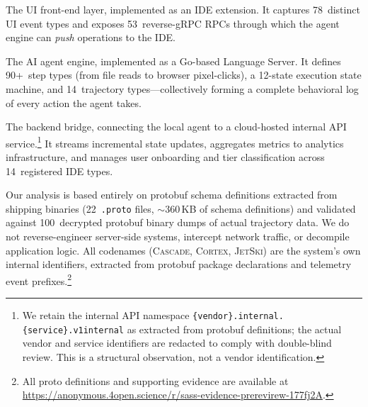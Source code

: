 \documentclass[sigconf,anonymous]{acmart}
\newcommand{\cascade}{\textsc{Cascade}\xspace}
\newcommand{\cortex}{\textsc{Cortex}\xspace}
\newcommand{\jetski}{\textsc{JetSki}\xspace}
\begin{document}
\begin{description}[style=unboxed,leftmargin=0pt,nosep]
  \item[\cascade] The UI front-end layer, implemented as an IDE
    extension.  It captures 78~distinct UI event types and exposes
    53~reverse-gRPC RPCs through which the agent engine can
    \emph{push} operations to the IDE.
  \item[\cortex] The AI agent engine, implemented as a Go-based
    Language Server.  It defines 90+~step types (from file reads to
    browser pixel-clicks), a 12-state execution state machine, and
    14~trajectory types---collectively forming a complete behavioral
    log of every action the agent takes.
  \item[\jetski] The backend bridge, connecting the local agent to
    a cloud-hosted internal API service.\footnote{We retain the internal
    API namespace \texttt{\{vendor\}.internal.\{service\}.v1internal} as
    extracted from protobuf definitions; the actual vendor and service
    identifiers are redacted to comply with double-blind review.  This
    is a structural observation, not a vendor identification.}  It streams incremental
    state updates, aggregates metrics to analytics infrastructure, and
    manages user onboarding and tier classification across 14~registered
    IDE types.
\end{description}

\noindent Our analysis is based entirely on protobuf schema definitions
extracted from shipping binaries (22~\texttt{.proto} files,
$\sim$360\,KB of schema definitions) and validated against
100~decrypted protobuf binary dumps of actual trajectory data.  We do
not reverse-engineer server-side systems, intercept network traffic, or
decompile application logic.  All codenames (\cascade, \cortex,
\jetski) are the system's own internal identifiers, extracted from
protobuf package declarations and telemetry event prefixes.\footnote{All
proto definitions and supporting evidence are available at
\url{https://anonymous.4open.science/r/sass-evidence-prerevirew-177fj2A}.}
\end{document}
